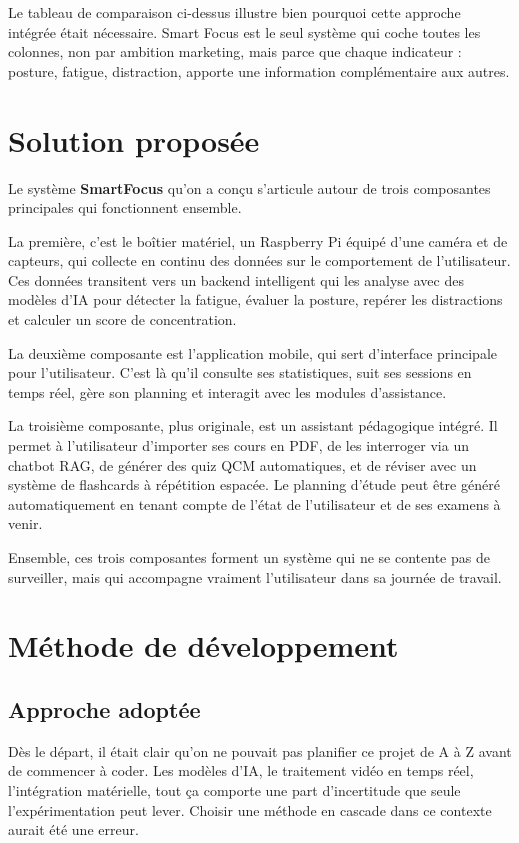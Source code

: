 Le tableau de comparaison ci-dessus illustre bien pourquoi cette approche intégrée était nécessaire. Smart Focus est le seul système qui coche toutes les colonnes, non par ambition marketing, mais parce que chaque indicateur : posture, fatigue, distraction, apporte une information complémentaire aux autres.

\section{Solution proposée}
\label{sec:solution}

Le système \textbf{SmartFocus} qu’on a conçu s’articule autour de trois composantes principales qui fonctionnent ensemble.

La première, c’est le boîtier matériel, un Raspberry Pi équipé d’une caméra et de capteurs, qui collecte en continu des données sur le comportement de l’utilisateur. Ces données transitent vers un backend intelligent qui les analyse avec des modèles d’IA pour détecter la fatigue, évaluer la posture, repérer les distractions et calculer un score de concentration.

La deuxième composante est l’application mobile, qui sert d’interface principale pour l’utilisateur. C’est là qu’il consulte ses statistiques, suit ses sessions en temps réel, gère son planning et interagit avec les modules d’assistance.

La troisième composante, plus originale, est un assistant pédagogique intégré. Il permet à l’utilisateur d’importer ses cours en PDF, de les interroger via un chatbot RAG, de générer des quiz QCM automatiques, et de réviser avec un système de flashcards à répétition espacée. Le planning d’étude peut être généré automatiquement en tenant compte de l’état de l’utilisateur et de ses examens à venir.

Ensemble, ces trois composantes forment un système qui ne se contente pas de surveiller, mais qui accompagne vraiment l’utilisateur dans sa journée de travail.

\section{Méthode de développement}

\subsection{Approche adoptée}

Dès le départ, il était clair qu’on ne pouvait pas planifier ce projet de A à Z avant de commencer à coder. Les modèles d’IA, le traitement vidéo en temps réel, l’intégration matérielle, tout ça comporte une part d’incertitude que seule l’expérimentation peut lever. Choisir une méthode en cascade dans ce contexte aurait été une erreur.

